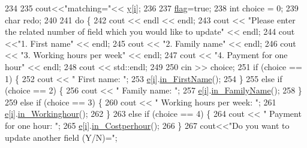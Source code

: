\begin{DoxyCode}
234  
235       cout<<\textcolor{stringliteral}{"matching="}<< \hyperlink{HumanResources_8cpp_a76e44bc53d2efde76380be19dc9ebbc3}{y}[\hyperlink{HumanResources_8cpp_acb559820d9ca11295b4500f179ef6392}{i}];
236  
237       \hyperlink{HumanResources_8cpp_a8b3ab54ed3e81c69863d65e4e6c424a0}{flag}=\textcolor{keyword}{true};
238       \textcolor{keywordtype}{int} choice = 0;
239       \textcolor{keywordtype}{char} redo;
240  
241       \textcolor{keywordflow}{do} \{
242         cout << endl << endl;
243         cout << \textcolor{stringliteral}{"Please enter the related number of field which you would like to update"} << endl;
244         cout <<\textcolor{stringliteral}{"1. First name"} << endl;
245         cout << \textcolor{stringliteral}{"2. Family name"} << endl;
246         cout << \textcolor{stringliteral}{"3. Working hours per week"} << endl;
247         cout << \textcolor{stringliteral}{"4. Payment for one hour"} << endl;
248         cout << std::endl;
249  
250         cin >> choice;
251         \textcolor{keywordflow}{if} (choice == 1) \{
252           cout << \textcolor{stringliteral}{" First name: "};
253           \hyperlink{classHRM_a79ccbda5f455cec5a04d53968f60e6af}{e}[\hyperlink{HumanResources_8cpp_acb559820d9ca11295b4500f179ef6392}{i}].\hyperlink{classPerson_a07320273da2b8a6957300d20d4594195}{in\_FirstName}();
254         \}
255         \textcolor{keywordflow}{else} \textcolor{keywordflow}{if} (choice == 2) \{
256           cout << \textcolor{stringliteral}{" Family name: "};
257           \hyperlink{classHRM_a79ccbda5f455cec5a04d53968f60e6af}{e}[\hyperlink{HumanResources_8cpp_acb559820d9ca11295b4500f179ef6392}{i}].\hyperlink{classPerson_a7ebc969ff71b7a9f93ff1e88a94c78d2}{in\_FamilyName}();
258         \}
259         \textcolor{keywordflow}{else} \textcolor{keywordflow}{if} (choice == 3) \{
260           cout << \textcolor{stringliteral}{" Working hours per week: "};
261           \hyperlink{classHRM_a79ccbda5f455cec5a04d53968f60e6af}{e}[\hyperlink{HumanResources_8cpp_acb559820d9ca11295b4500f179ef6392}{i}].\hyperlink{classPerson_a1aac8b7a7c6fa6c4ed3c7ce96d98c65e}{in\_Workinghour}();
262         \}
263         \textcolor{keywordflow}{else} \textcolor{keywordflow}{if} (choice == 4) \{
264           cout << \textcolor{stringliteral}{" Payment for one hour: "};
265           \hyperlink{classHRM_a79ccbda5f455cec5a04d53968f60e6af}{e}[\hyperlink{HumanResources_8cpp_acb559820d9ca11295b4500f179ef6392}{i}].\hyperlink{classPerson_a81602e50aff78c8f2d8eef65f422388a}{in\_Costperhour}();
266         \}
267         cout<<\textcolor{stringliteral}{"Do you want to update another field (Y/N)="};

\end{DoxyCode}
